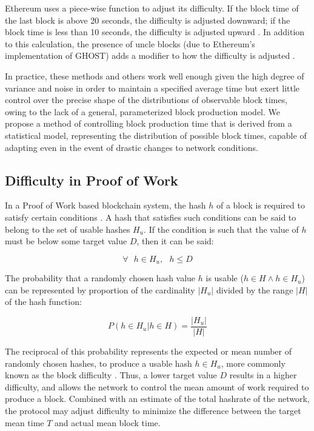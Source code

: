 \documentclass[]{article}
\begin{document}
Ethereum uses a piece-wise function to adjust its difficulty.  If the block time of the last block is above 20 seconds, the difficulty is adjusted downward; if the block time is less than 10 seconds, the difficulty is adjusted upward \cite{EthereumDifficulty}.  In addition to this calculation, the presence of uncle blocks (due to Ethereum's implementation of GHOST) adds a modifier to how the difficulty is adjusted \cite{EthereumUncles}.
\newline

In practice, these methods and others work well enough given the high degree of variance and noise in order to maintain a specified average time but exert little control over the precise shape of the distributions of observable block times, owing to the lack of a general, parameterized block production model.  We propose a method of controlling block production time that is derived from a statistical model, representing the distribution of possible block times, capable of adapting even in the event of drastic changes to network conditions.

\subsection{Difficulty in Proof of Work}
In a Proof of Work based blockchain system, the hash $h$ of a block is required to satisfy certain conditions \cite{BitcoinWhitepaper}.  A hash that satisfies such conditions can be said to belong to the set of usable hashes $H_u$.  If the condition is such that the value of $h$ must be below some target value $D$, then it can be said:

\begin{equation}
\forall \text{ } h \in H_u, \text{ } h \le D
\end{equation}

The probability that a randomly chosen hash value $h$ is usable ($h \in H \land h \in H_u$) can be represented by proportion of the cardinality $|H_u|$ divided by the range $|H|$ of the hash function: 

\begin{equation}
	P(h \in H_u | h \in H) = \frac{|H_u|}{|H|} 
\end{equation}

The reciprocal of this probability represents the expected or mean number of randomly chosen hashes, to produce a usable hash $h \in H_u$, more commonly known as the block difficulty \cite{BitcoinCore}.  Thus, a lower target value $D$ results in a higher difficulty, and allows the network to control the mean amount of work required to produce a block.  Combined with an estimate of the total hashrate of the network, the protocol may adjust difficulty to minimize the difference between the target mean time $T$ and actual mean block time.  
\end{document}
